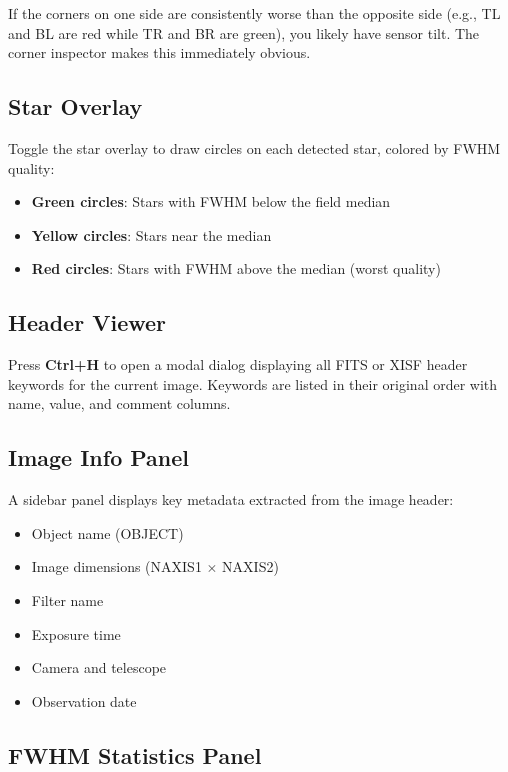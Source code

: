 \documentclass[11pt,a4paper]{article}
\begin{document}
\begin{tipbox}
If the corners on one side are consistently worse than the opposite side (e.g., TL and BL are red while TR and BR are green), you likely have sensor tilt. The corner inspector makes this immediately obvious.
\end{tipbox}

\subsection{Star Overlay}

Toggle the star overlay to draw circles on each detected star, colored by FWHM quality:
\begin{itemize}
    \item \textcolor{successgreen}{\textbf{Green circles}}: Stars with FWHM below the field median
    \item \textcolor{warningorange}{\textbf{Yellow circles}}: Stars near the median
    \item \textcolor{errorcoral}{\textbf{Red circles}}: Stars with FWHM above the median (worst quality)
\end{itemize}

\subsection{Header Viewer}

Press \textbf{Ctrl+H} to open a modal dialog displaying all FITS or XISF header keywords for the current image. Keywords are listed in their original order with name, value, and comment columns.

\subsection{Image Info Panel}

A sidebar panel displays key metadata extracted from the image header:
\begin{itemize}
    \item Object name (OBJECT)
    \item Image dimensions (NAXIS1 $\times$ NAXIS2)
    \item Filter name
    \item Exposure time
    \item Camera and telescope
    \item Observation date
\end{itemize}

\subsection{FWHM Statistics Panel}
\end{document}

